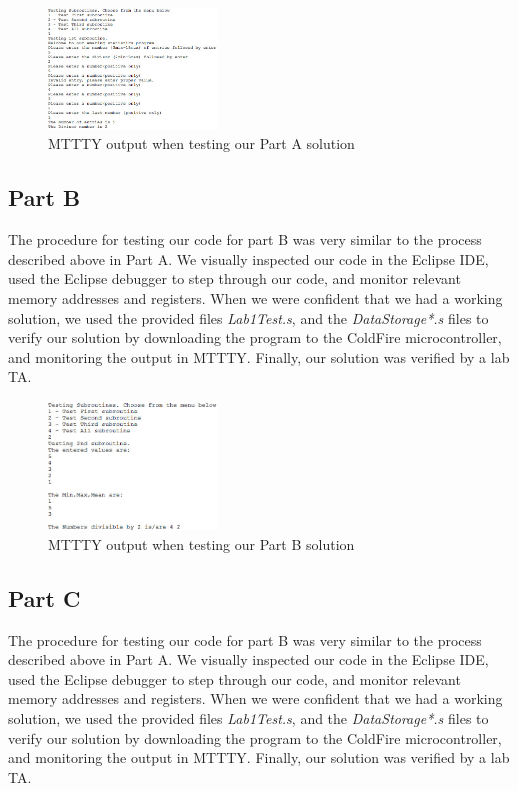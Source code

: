 \documentclass[letterpaper]{article}
\begin{document}
    \begin{figure}[H]
      \centering
      \includegraphics[width=0.4\textwidth]{parta.jpg}
      \caption{MTTTY output when testing our Part A solution}
    \end{figure}

  \subsection{Part B}
    The procedure for testing our code for part B was very similar to the process
    described above in Part A. We visually inspected our code in the Eclipse IDE,
    used the Eclipse debugger to step through our code, and monitor relevant
    memory addresses and registers. When we were confident that we had a working
    solution, we used the provided files \textit{Lab1Test.s}, and the \textit{DataStorage*.s}
    files to verify our solution by downloading the program to the ColdFire microcontroller,
    and monitoring the output in MTTTY. Finally, our solution was verified by a lab TA.

    \begin{figure}[H]
      \centering
      \includegraphics[width=0.4\textwidth]{partb.jpg}
      \caption{MTTTY output when testing our Part B solution}
    \end{figure}

    \subsection{Part C}
      The procedure for testing our code for part B was very similar to the process
      described above in Part A. We visually inspected our code in the Eclipse IDE,
      used the Eclipse debugger to step through our code, and monitor relevant
      memory addresses and registers. When we were confident that we had a working
      solution, we used the provided files \textit{Lab1Test.s}, and the \textit{DataStorage*.s}
      files to verify our solution by downloading the program to the ColdFire microcontroller,
      and monitoring the output in MTTTY. Finally, our solution was verified by a lab TA.
\end{document}
